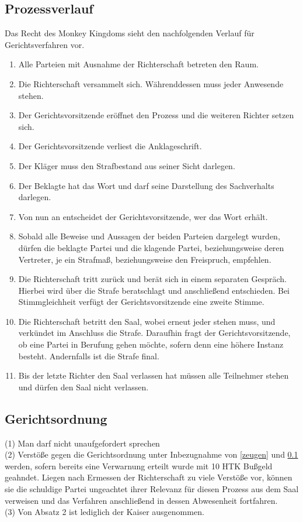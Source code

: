 \documentclass{article}
\begin{document}
\subsection{Prozessverlauf}\label{verlauf}
Das Recht des Monkey Kingdoms sieht den nachfolgenden Verlauf für Gerichtsverfahren vor.\\
\begin{enumerate}
	\item Alle Parteien mit Ausnahme der Richterschaft betreten den Raum.
	\item Die Richterschaft versammelt sich. Währenddessen muss jeder Anwesende stehen.
	\item Der Gerichtsvorsitzende eröffnet den Prozess und die weiteren Richter setzen sich.
	\item Der Gerichtsvorsitzende verliest die Anklageschrift.
	\item Der Kläger muss den Strafbestand aus seiner Sicht darlegen.
	\item Der Beklagte hat das Wort und darf seine Darstellung des Sachverhalts darlegen.
	\item Von nun an entscheidet der Gerichtsvorsitzende, wer das Wort erhält.
	\item Sobald alle Beweise und Aussagen der beiden Parteien dargelegt wurden, dürfen die beklagte Partei und die klagende Partei, beziehungsweise deren Vertreter, je ein Strafmaß, beziehungsweise den Freispruch, empfehlen.
	\item Die Richterschaft tritt zurück und berät sich in einem separaten Gespräch. Hierbei wird über die Strafe beratschlagt und anschließend entschieden. Bei Stimmgleichheit verfügt der Gerichtsvorsitzende eine zweite Stimme.
	\item Die Richterschaft betritt den Saal, wobei erneut jeder stehen muss, und verkündet im Anschluss die Strafe. Daraufhin fragt der Gerichtsvorsitzende, ob eine Partei in Berufung gehen möchte, sofern denn eine höhere Instanz besteht. Andernfalls ist die Strafe final.
	\item Bis der letzte Richter den Saal verlassen hat müssen alle Teilnehmer stehen und dürfen den Saal nicht verlassen.
\end{enumerate}

\subsection{Gerichtsordnung}\label{gordnung}
(1) Man darf nicht unaufgefordert sprechen\\
(2) Verstöße gegen die Gerichtsordnung unter Inbezugnahme von \ref{zeugen} und \ref{verlauf} werden, sofern bereits eine Verwarnung erteilt wurde mit 10 HTK Bußgeld geahndet. Liegen nach Ermessen der Richterschaft zu viele Verstöße vor, können sie die schuldige Partei ungeachtet ihrer Relevanz für diesen Prozess aus dem Saal verweisen und das Verfahren anschließend in dessen Abwesenheit fortfahren.\\
(3) Von Absatz 2 ist lediglich der Kaiser ausgenommen.
\end{document}
